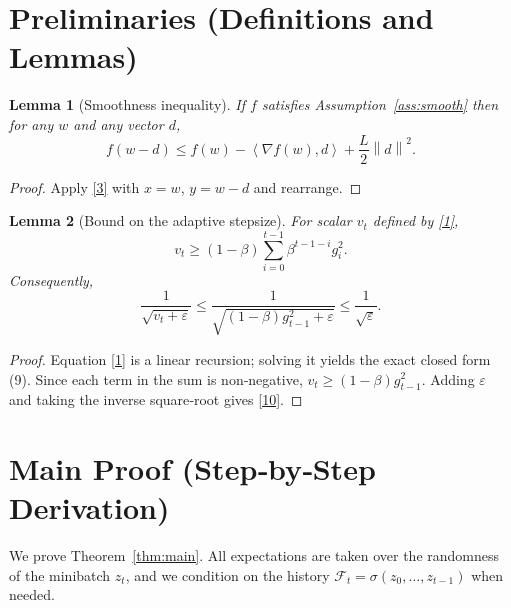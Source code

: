 \documentclass{article}
\newtheorem{lemma}{Lemma}
\newcommand{\norm}[1]{\left\lVert #1 \right\rVert}
\newcommand{\ip}[2]{\left\langle #1,#2 \right\rangle}
\begin{document}
\newpage
\section*{Preliminaries (Definitions and Lemmas)}
\begin{lemma}[Smoothness inequality]\label{lem:smooth}
If $f$ satisfies Assumption~\ref{ass:smooth} then for any $w$ and any
vector $d$,
\[
f(w-d)\le f(w)-\ip{\nabla f(w)}{d}+\frac{L}{2}\norm{d}^{2}.
\tag{8}
\]
\end{lemma}
\begin{proof}
Apply \eqref{3} with $x=w$, $y=w-d$ and rearrange.
\end{proof}

\begin{lemma}[Bound on the adaptive stepsize]\label{lem:denom}
For scalar $v_{t}$ defined by \eqref{1},
\[
v_{t}\ge (1-\beta)\sum_{i=0}^{t-1}\beta^{t-1-i}g_{i}^{2}.
\tag{9}
\]
Consequently,
\[
\frac{1}{\sqrt{v_{t}+\varepsilon}}\le
\frac{1}{\sqrt{(1-\beta)g_{t-1}^{2}+\varepsilon}}\le
\frac{1}{\sqrt{\varepsilon}}.
\tag{10}
\]
\end{lemma}
\begin{proof}
Equation \eqref{1} is a linear recursion; solving it yields the exact
closed form (9).  Since each term in the sum is non‑negative,
$v_{t}\ge (1-\beta)g_{t-1}^{2}$.  Adding $\varepsilon$ and taking the
inverse square‑root gives \eqref{10}.
\end{proof}

\section*{Main Proof (Step‑by‑Step Derivation)}
We prove Theorem~\ref{thm:main}.  All expectations are taken over the
randomness of the minibatch $z_{t}$, and we condition on the history
$\mathcal{F}_{t}=\sigma(z_{0},\dots,z_{t-1})$ when needed.
\end{document}
